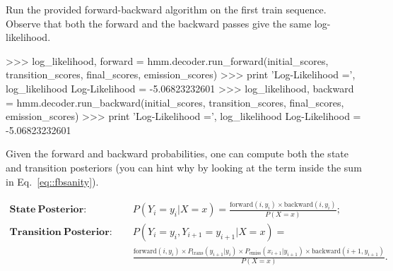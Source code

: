 \begin{exercise}
%
%

Run the provided forward-backward algorithm on the first train sequence. 
Observe that both the forward and the backward 
passes give the same log-likelihood.
\begin{python}
>>> log_likelihood, forward = hmm.decoder.run_forward(initial_scores, transition_scores, final_scores, emission_scores)
>>> print 'Log-Likelihood =', log_likelihood
Log-Likelihood = -5.06823232601
>>> log_likelihood, backward = hmm.decoder.run_backward(initial_scores, transition_scores, final_scores, emission_scores)
>>> print 'Log-Likelihood =', log_likelihood
Log-Likelihood = -5.06823232601
\end{python}
\end{exercise}


Given the forward and backward probabilities, one can compute both the state
and transition posteriors 
(you can hint why by looking at the term inside the sum in Eq.~\ref{eq::fbsanity}).


\begin{align}
 \mathbf{State \ Posterior\!:}\;\;\;\;  & P(Y_i = y_i| X=x) = \frac{\mathrm{forward}(i, y_i) \times 
 \mathrm{backward}(i, y_i)}{P(X=x)}; \label{eq::nodePosterior2} \\
 \mathbf{Transition \ Posterior\!:}\;\;\;\; &
 P(Y_i = y_i, Y_{i+1} = y_{i+1} | X=x)= \nonumber\\
 &
   \frac{\mathrm{forward}(i, y_i) \times 
   P_{\mathrm{trans}}(y_{i+1}|y_i) \times
   P_{\mathrm{emiss}}(x_{i+1}|y_{i+1}) \times
 \mathrm{backward}(i+1, y_{i+1})}{P(X=x)}.\label{eq::edgePosterior2}
\end{align}

